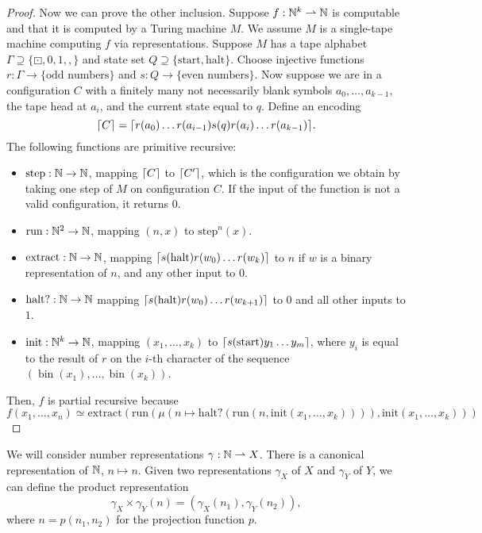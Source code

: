 \begin{proof}
  Now we can prove the other inclusion.
  Suppose $f: \mathbb{N}^k \rightharpoonup \mathbb{N}$ is computable and that it is computed by
  a Turing machine $M$.
  We assume $M$ is a single-tape machine computing $f$ via representations.
  Suppose $M$ has a tape alphabet $\Gamma \supseteq \{\boxdot, 0, 1,
  \mathtt{,}\}$ and state set $Q \supseteq \{\text{start}, \text{halt}\}$.
  Choose injective functions $r: \Gamma \to \{\text{odd numbers}\}$ and $s: Q
  \to \{\text{even numbers}\}$.
  Now suppose we are in a configuration $C$ with a finitely many not necessarily
  blank symbols $a_0, \ldots, a_{k-1}$, the tape head at $a_i$, and the current
  state equal to $q$.
  Define an encoding
  \[
	\lceil C \rceil = \lceil r(a_0) \ldots r(a_{i-1}) s(q) r(a_i) \ldots r(a_{k-1}) \rceil.
  \]
  The following functions are primitive recursive:
  \begin{itemize}
  \item $\text{step}: \mathbb{N} \to \mathbb{N}$, mapping $\lceil C \rceil$ to $\lceil C' \rceil$, which is
	the configuration we obtain by taking one step of $M$ on configuration $C$.
	If the input of the function is not a valid configuration, it returns $0$.
  \item $\text{run}: \mathbb{N}^2 \to \mathbb{N}$, mapping $(n,x)$ to $\text{step}^n(x)$.
  \item $\text{extract}: \mathbb{N} \to \mathbb{N}$, mapping $\lceil s(\text{halt}) r(w_0) \ldots
	  r(w_k) \rceil$ to $n$ if $w$ is a binary representation of $n$, and any other
	input to $0$.
  \item $\text{halt?}: \mathbb{N} \to \mathbb{N}$ mapping $\lceil s(\text{halt}) r(w_0) \ldots
	  r(w_{k+1}) \rceil$ to $0$ and all other inputs to $1$.
  \item $\text{init}: \mathbb{N}^k \to \mathbb{N}$, mapping $(x_1, \ldots, x_k)$ to
	$\lceil s(\text{start}) y_1 \ldots y_m \rceil$, where $y_i$ is equal to the result
	of $r$ on the $i$-th character of the sequence $(\operatorname{bin}(x_1),
	\ldots, \operatorname{bin}(x_k))$.
  \end{itemize}
  Then, $f$ is partial recursive because
  \[
	f(x_1, \ldots, x_n) \simeq \text{extract}(\text{run}(
	\mu(n \mapsto \text{halt?}(\text{run}(n, \text{init}(x_1, \ldots, x_k)))),
	\text{init}(x_1, \ldots, x_k)
	))
  \]
\end{proof}


We will consider number representations $\gamma: \mathbb{N} \rightharpoonup X$.
There is a canonical representation of $\mathbb{N}$, $n \mapsto n$.
Given two representations $\gamma_X$ of $X$ and $\gamma_Y$ of $Y$, we can define
the product representation
\[
  \gamma_X \times \gamma_Y (n) = (\gamma_X(n_1), \gamma_Y(n_2)),
\]
where $n = p(n_1, n_2)$ for the projection function $p$.

